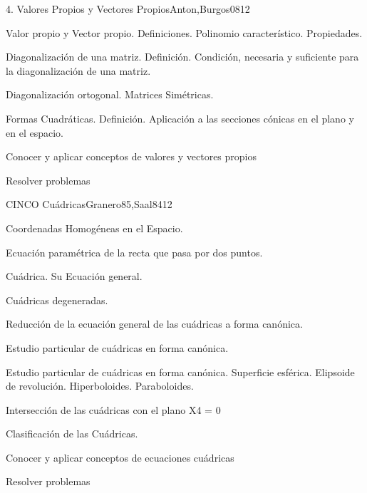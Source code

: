 \begin{syllabus}
\begin{unit}{4. Valores Propios y Vectores Propios}{Anton,Burgos08}{12}
\begin{topics}
      \item Valor propio y Vector propio. Definiciones. Polinomio característico. Propiedades.
      \item Diagonalización de una matriz. Definición. Condición, necesaria y suficiente para la diagonalización de una matriz.
      \item Diagonalización ortogonal. Matrices Simétricas.
	\item Formas Cuadráticas. Definición. Aplicación a las secciones cónicas en el plano y en el espacio.
	\end{topics}

   \begin{unitgoals}
      \item Conocer y aplicar conceptos de valores y vectores propios
	\item Resolver problemas
   \end{unitgoals}
\end{unit}

\begin{unit}{CINCO Cuádricas}{Granero85,Saal84}{12}
\begin{topics}
      \item Coordenadas Homogéneas en el Espacio.
	\item Ecuación paramétrica de la recta que pasa por dos puntos.
	\item Cuádrica. Su Ecuación general.
	\item Cuádricas degeneradas.
	\item Reducción de la ecuación general de las cuádricas a forma canónica.
	\item Estudio particular de cuádricas en forma canónica.
	\item Estudio particular de cuádricas en forma canónica. Superficie esférica. Elipsoide de revolución. Hiperboloides. Paraboloides.
	\item Intersección de las cuádricas con el plano X4 = 0
	\item Clasificación de las Cuádricas.
   \end{topics}

   \begin{unitgoals}
      \item Conocer y aplicar conceptos de ecuaciones cuádricas
	\item Resolver problemas
   \end{unitgoals}
\end{unit}

\begin{coursebibliography}
\end{coursebibliography}
\end{syllabus}
